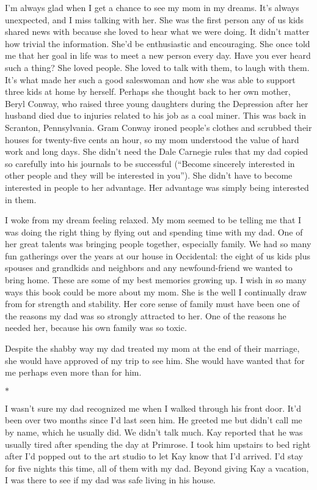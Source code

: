 \documentclass[12pt]{book}
\begin{document}
I'm always glad when I get a chance to see my mom in my dreams. It's always unexpected, and I miss talking with her. She was the first person any of us kids shared news with because she loved to hear what we were doing. It didn't matter how trivial the information. She'd be enthusiastic and encouraging. She once told me that her goal in life was to meet a new person every day. Have you ever heard such a thing? She loved people. She loved to talk with them, to laugh with them. It's what made her such a good saleswoman and how she was able to support three kids at home by herself. Perhaps she thought back to her own mother, Beryl Conway, who raised three young daughters during the Depression after her husband died due to injuries related to his job as a coal miner. This was back in Scranton, Pennsylvania. Gram Conway ironed people's clothes and scrubbed their houses for twenty-five cents an hour, so my mom understood the value of hard work and long days. She didn't need the Dale Carnegie rules that my dad copied so carefully into his journals to be successful (``Become sincerely interested in other people and they will be interested in you''). She didn't have to become interested in people to her advantage. Her advantage was simply being interested in them.

I woke from my dream feeling relaxed. My mom seemed to be telling me that I was doing the right thing by flying out and spending time with my dad. One of her great talents was bringing people together, especially family. We had so many fun gatherings over the years at our house in Occidental: the eight of us kids plus spouses and grandkids and neighbors and any newfound-friend we wanted to bring home. These are some of my best memories growing up. I wish in so many ways this book could be more about my mom. She is the well I continually draw from for strength and stability. Her core sense of family must have been one of the reasons my dad was so strongly attracted to her. One of the reasons he needed her, because his own family was so toxic.

Despite the shabby way my dad treated my mom at the end of their marriage, she would have approved of my trip to see him. She would have wanted that for me perhaps even more than for him.

\begin{center}$*$\end{center}

I wasn't sure my dad recognized me when I walked through his front door. It'd been over two months since I'd last seen him. He greeted me but didn't call me by name, which he usually did. We didn't talk much. Kay reported that he was usually tired after spending the day at Primrose. I took him upstairs to bed right after I'd popped out to the art studio to let Kay know that I'd arrived. I'd stay for five nights this time, all of them with my dad. Beyond giving Kay a vacation, I was there to see if my dad was safe living in his house.
\end{document}

